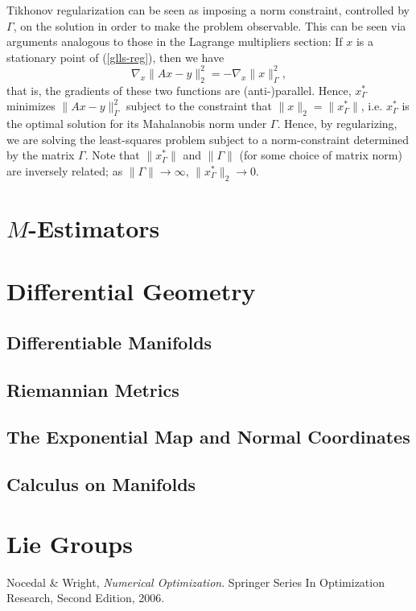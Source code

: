 \documentclass[reqno]{amsart}
\numberwithin{equation}{section}
\begin{document}
Tikhonov regularization can be seen as imposing a norm constraint, controlled by $\Gamma$, on
the solution in order to make the problem observable. This can be seen via arguments analogous
to those in the Lagrange multipliers section: If $x$ is a stationary point of
(\ref{glls-reg}), then we have
$$
    \nabla_x \| Ax - y \|_2^2 = -\nabla_x \| x \|_{\Gamma}^2,
$$
that is, the gradients of these two functions are (anti-)parallel. Hence, $x^*_{\Gamma}$ minimizes
$\|Ax - y\|_{\Gamma}^2$ subject to the constraint that $\| x \|_2 = \|x^*_{\Gamma}\|$, i.e.
$x^*_{\Gamma}$ is the optimal solution for its Mahalanobis norm under $\Gamma$. Hence, by
regularizing, we are solving the least-squares problem subject to a norm-constraint determined
by the matrix $\Gamma$. Note that $\|x^*_{\Gamma}\|$
and $\|\Gamma\|$ (for some choice of matrix norm) are inversely related; as
$\|\Gamma\| \to \infty$, $\|x^*_\Gamma\|_2 \to 0$.

\section {$M$-Estimators}

\section{Differential Geometry}
\subsection{Differentiable Manifolds}
\subsection{Riemannian Metrics}
\subsection{The Exponential Map and Normal Coordinates}
\subsection{Calculus on Manifolds}

\section{Lie Groups}

\begin{thebibliography}{999}

Nocedal \& Wright,
\emph{Numerical Optimization}.
Springer Series In Optimization Research,
Second Edition,
2006.

\end{thebibliography}
\end{document}
